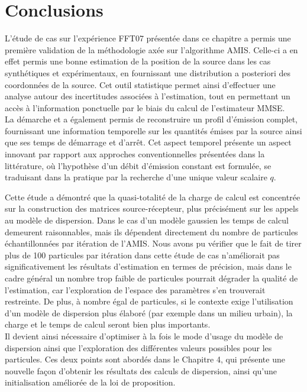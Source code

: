 \section{Conclusions}

L'étude de cas sur l'expérience FFT07 présentée dans ce chapitre a permis une première validation de la méthodologie axée sur l'algorithme AMIS. Celle-ci a en effet permis une bonne estimation de la position de la source dans les cas synthétiques et expérimentaux,  en fournissant une distribution a posteriori des coordonnées de la source. Cet outil statistique permet ainsi d'effectuer une analyse autour des incertitudes associées à l'estimation, {tout en permettant un accès à l'information ponctuelle} par le biais du calcul de l'estimateur MMSE. \\

 La démarche et a également permis de reconstruire un profil d'émission complet, fournissant une information temporelle sur les quantités émises par la source ainsi que ses temps de démarrage et d'arrêt. Cet aspect temporel présente un aspect innovant par rapport aux approches conventionnelles présentées dans la littérature, où l'hypothèse d'un débit d'émission constant est formulée, se traduisant dans la pratique par la recherche d'une unique valeur scalaire $q$. 
 
Cette étude a démontré que la quasi-totalité de la charge de calcul est concentrée sur la construction des matrices source-récepteur, plus précisément sur les appels au modèle de dispersion. Dans le cas d'un modèle gaussien les temps de calcul demeurent raisonnables, mais ils dépendent directement du nombre de particules échantillonnées par itération de l'AMIS. Nous avons pu vérifier que le fait de tirer plus de 100 particules par itération dans cette étude de cas n'améliorait pas significativement les résultats d'estimation {en termes de précision}, mais dans le cadre général un nombre trop faible de particules pourrait dégrader la qualité de l'estimation, car l'exploration de l'espace des paramètres s'en trouverait restreinte. De plus, à nombre égal de particules, si le contexte exige l'utilisation d'un modèle de dispersion plus élaboré (par exemple dans un milieu urbain), la charge et le temps de calcul seront bien plus importants. \\

{Il devient ainsi nécessaire d'optimiser à la fois le mode d'usage du modèle de dispersion ainsi que l'exploration des différentes valeurs possibles pour les particules. Ces deux points sont abordés dans le Chapitre 4, qui présente une nouvelle façon d'obtenir les résultats des calculs de dispersion, ainsi qu'une initialisation améliorée de la loi de proposition.}


